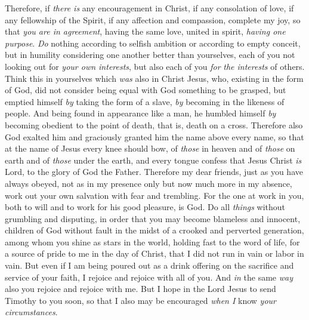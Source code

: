 \begin{biblechapter} %
 Therefore, if \textit{there is} any encouragement in Christ, if any consolation of love, if any fellowship of the Spirit, if any affection and compassion,
\verse complete my joy, so that \textit{you are in agreement}, having the same love, united in spirit, \textit{having one purpose}.
\verse \textit{Do} nothing according to selfish ambition or according to empty conceit, but in humility considering one another better than yourselves,
\verse each of you not looking out for \textit{your own interests}, but also each of you \textit{for} \textit{the interests} of others.
 Think this in yourselves which \textit{was} also in Christ Jesus,
\verse who, existing in the form of God, 
did not consider being equal with God something to be grasped,
\verse but emptied himself 
\textit{by} taking the form of a slave, 
\textit{by} becoming in the likeness of people. 
And being found in appearance like a man,
\verse he humbled himself 
\textit{by} becoming obedient to the point of death, 
that is, death on a cross.
\verse Therefore also God exalted him 
and graciously granted him the name above every name,
\verse so that at the name of Jesus 
every knee should bow, 
of \textit{those} in heaven and of \textit{those} on earth and of \textit{those} under the earth,
\verse and every tongue confess 
that Jesus Christ \textit{is} Lord, 
to the glory of God the Father.
 Therefore my dear friends, just as you have always obeyed, not as in my presence only but now much more in my absence, work out your own salvation with fear and trembling.
\verse For the one at work in you, both to will and to work for his good pleasure, is God.
\verse Do all \textit{things} without grumbling and disputing,
\verse in order that you may become blameless and innocent, children of God without fault in the midst of a crooked and perverted generation, among whom you shine as stars in the world,
\verse holding fast to the word of life, for a source of pride to me in the day of Christ, that I did not run in vain or labor in vain.
\verse But even if I am being poured out as a drink offering on the sacrifice and service of your faith, I rejoice and rejoice with all of you.
\verse And \textit{in} the same \textit{way} also you rejoice and rejoice with me.
 But I hope in the Lord Jesus to send Timothy to you soon, so that I also may be encouraged \textit{when I} know \textit{your circumstances}.

\end{biblechapter}
